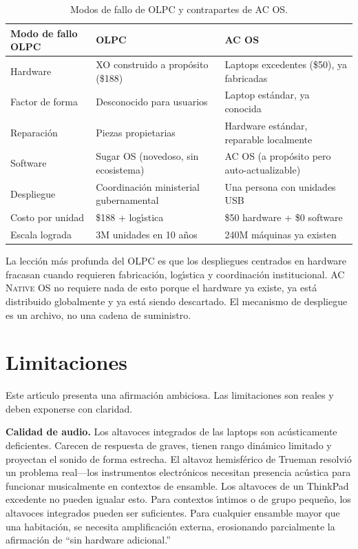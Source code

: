 \documentclass[10pt,letterpaper,twocolumn]{article}
\newcommand{\acos}{\textsc{AC Native OS}}
\begin{document}
\begin{table}[h]
\small
\centering
\begin{tabularx}{\columnwidth}{lXX}
\toprule
\textbf{Modo de fallo OLPC} & \textbf{OLPC} & \textbf{AC OS} \\
\midrule
Hardware & XO construido a prop\'{o}sito (\$188) & Laptops excedentes (\$50), ya fabricadas \\
Factor de forma & Desconocido para usuarios & Laptop est\'{a}ndar, ya conocida \\
Reparaci\'{o}n & Piezas propietarias & Hardware est\'{a}ndar, reparable localmente \\
Software & Sugar OS (novedoso, sin ecosistema) & AC OS (a prop\'{o}sito pero auto-actualizable) \\
Despliegue & Coordinaci\'{o}n ministerial gubernamental & Una persona con unidades USB \\
Costo por unidad & \$188 + log\'{\i}stica & \$50 hardware + \$0 software \\
Escala lograda & 3M unidades en 10 a\~{n}os & 240M m\'{a}quinas ya existen \\
\bottomrule
\end{tabularx}
\caption{Modos de fallo de OLPC y contrapartes de AC OS.}
\label{tab:olpc}
\end{table}

La lecci\'{o}n m\'{a}s profunda del OLPC es que los despliegues centrados en hardware fracasan cuando requieren fabricaci\'{o}n, log\'{\i}stica y coordinaci\'{o}n institucional. \acos{} no requiere nada de esto porque el hardware ya existe, ya est\'{a} distribuido globalmente y ya est\'{a} siendo descartado. El mecanismo de despliegue es un archivo, no una cadena de suministro.


\section{Limitaciones}
\label{sec:limitations}

Este art\'{\i}culo presenta una afirmaci\'{o}n ambiciosa. Las limitaciones son reales y deben exponerse con claridad.

\textbf{Calidad de audio.} Los altavoces integrados de las laptops son ac\'{u}sticamente deficientes. Carecen de respuesta de graves, tienen rango din\'{a}mico limitado y proyectan el sonido de forma estrecha. El altavoz hemisf\'{e}rico de Trueman resolvi\'{o} un problema real---los instrumentos electr\'{o}nicos necesitan presencia ac\'{u}stica para funcionar musicalmente en contextos de ensamble. Los altavoces de un ThinkPad excedente no pueden igualar esto. Para contextos \'{\i}ntimos o de grupo peque\~{n}o, los altavoces integrados pueden ser suficientes. Para cualquier ensamble mayor que una habitaci\'{o}n, se necesita amplificaci\'{o}n externa, erosionando parcialmente la afirmaci\'{o}n de ``sin hardware adicional.''
\end{document}
